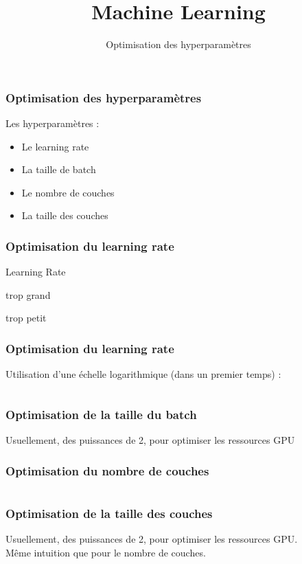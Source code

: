 \documentclass{formation}
\title{Machine Learning}
\subtitle{Optimisation des hyperparamètres}
\begin{document}
\maketitle

\begin{frame}
  \frametitle{Optimisation des hyperparamètres}
  \begin{minipage}[l]{0.49\linewidth}
  \end{minipage}\hfill
  \begin{minipage}[l]{0.49\linewidth}
  Les hyperparamètres :
  \begin{itemize}
  \item Le learning rate
  \item La taille de batch
  \item Le nombre de couches
  \item La taille des couches
  \end{itemize}
  \end{minipage}\hfill
\end{frame}

\begin{frame}
  \frametitle{Optimisation du learning rate}
  \begin{center}Learning Rate\end{center}
  \begin{minipage}[l]{0.49\linewidth}
    \begin{center}trop grand\end{center}
  \end{minipage}\hfill
  \begin{minipage}[l]{0.49\linewidth}
    \begin{center}trop petit\end{center}
  \end{minipage}\hfill
\end{frame}

\begin{frame}
  \frametitle{Optimisation du learning rate}
  Utilisation d'une échelle logarithmique (dans un premier temps) :
  \inputminted[linenos,fontsize=\small,bgcolor=pythonbg]{python}{code-illustration/gridsearch-template.py}
\end{frame}

\begin{frame}
  \frametitle{Optimisation de la taille du batch}
  Usuellement, des puissances de 2, pour optimiser les ressources GPU
\end{frame}

\begin{frame}
  \frametitle{Optimisation du nombre de couches}
  \inputminted[linenos,fontsize=\small,bgcolor=pythonbg]{python}{code-illustration/addlayer-template.py}
\end{frame}

\begin{frame}
  \frametitle{Optimisation de la taille des couches}
  Usuellement, des puissances de 2, pour optimiser les ressources GPU. \\
  Même intuition que pour le nombre de couches.
\end{frame}
\end{document}
